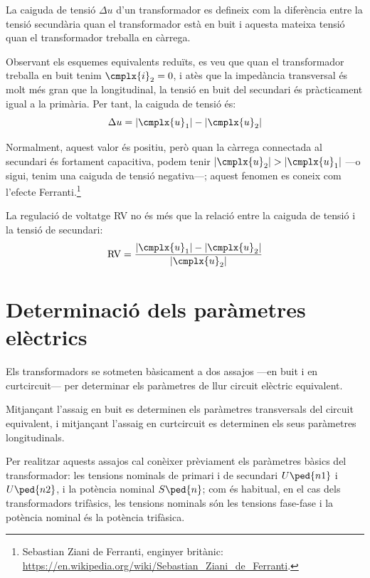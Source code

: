 La caiguda de tensió $\Delta u$ d'un transformador  es defineix com la diferència entre la tensió secundària quan el transformador està en buit i aquesta mateixa tensió quan el transformador treballa en càrrega.

Observant els esquemes equivalents reduïts, es veu que quan el transformador treballa en buit tenim $\cmplx{i}_2=0$, i atès que la impedància transversal és molt més gran que la longitudinal, la tensió en buit del secundari és pràcticament igual a la primària. Per tant, la caiguda de tensió és:
\begin{equation}
    \Delta u = |\cmplx{u}_1| - |\cmplx{u}_2|
\end{equation}

Normalment, aquest valor és positiu, però quan la càrrega connectada al secundari és fortament capacitiva, podem tenir  $|\cmplx{u}_2| > |\cmplx{u}_1|$ ---o sigui, tenim una caiguda de tensió negativa---; aquest fenomen  es coneix com l'efecte Ferranti.\footnote{Sebastian Ziani de Ferranti, enginyer britànic: \href{https://en.wikipedia.org/wiki/Sebastian_Ziani_de_Ferranti}{https:/\!\!/en.wikipedia.org/wiki/Sebastian\_Ziani\_de\_Ferranti}.}

La regulació de voltatge RV no és més que la relació entre la caiguda de tensió i la tensió de secundari:
\begin{equation}
    \text{RV} = \frac{|\cmplx{u}_1| - |\cmplx{u}_2|}{|\cmplx{u}_2|}
\end{equation}

\section{Determinació dels paràmetres elèctrics}\label{sec:determ-param-trafo}

Els transformadors se sotmeten bàsicament a dos assajos ---en
buit i en curtcircuit--- per determinar els paràmetres
de llur circuit elèctric equivalent.

Mitjançant l'assaig en buit es determinen els paràmetres
transversals del circuit equivalent, i mitjançant l'assaig en curtcircuit es determinen els seus paràmetres longitudinals.

Per  realitzar aquests assajos cal conèixer prèviament els paràmetres
bàsics del transformador: les tensions nominals de primari i de
secundari $U\ped{n1}$ i $U\ped{n2}$, i la potència nominal
$S\ped{n}$; com és habitual, en el cas dels transformadors
trifàsics, les tensions nominals són les tensions fase-fase i la
potència nominal és la potència trifàsica.

